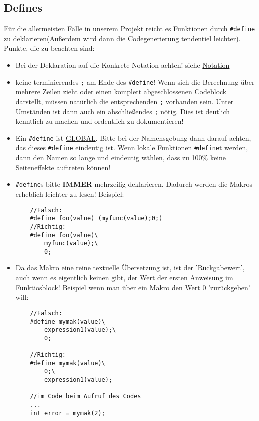 \documentclass[]{scrartcl}
\begin{document}
\subsection{Defines}
\label{sbsec:Defines}
Für die allermeisten Fälle in unserem Projekt reicht es Funktionen durch \lstinline|#define| zu deklarieren(Außerdem wird dann die Codegenerierung tendentiel leichter). Punkte, die zu beachten sind:
\begin{itemize}
\item Bei der Deklaration auf die Konkrete Notation achten! siehe \href{http://www2.informatik.uni-halle.de/lehre/c/c_define.html}{Notation}
\item keine terminierendes \lstinline|;| am Ende des \lstinline|#define|! Wenn sich die Berechnung über mehrere Zeilen zieht oder einen komplett abgeschlossenen Codeblock darstellt, müssen natürlich die entsprechenden \lstinline|;| vorhanden sein. Unter Umständen ist dann auch ein abschließendes \lstinline|;| nötig. Dies ist deutlich kenntlich zu machen und ordentlich zu dokumentieren!
\item Ein \lstinline|#define| ist \underline{GLOBAL}. Bitte bei der Namensgebung dann darauf achten, das dieses \lstinline|#define| eindeutig ist. Wenn lokale Funktionen \lstinline|#define|t werden, dann den Namen so lange und eindeutig wählen, dass zu 100\% keine Seiteneffekte auftreten können!
\item \lstinline|#define|s bitte \textbf{IMMER} mehrzeilig deklarieren. Dadurch werden die Makros erheblich leichter zu lesen!
	Beispiel:
	\begin{lstlisting}
	//Falsch:
	#define foo(value) (myfunc(value);0;)
	//Richtig:
	#define foo(value)\
		myfunc(value);\
		0;
	\end{lstlisting}
\item Da das Makro eine reine textuelle Übersetzung ist, ist der 'Rückgabewert', auch wenn es eigentlich keinen gibt, der Wert der ersten Anweisung im Funktiosblock! Beispiel wenn man über ein Makro den Wert 0 'zurückgeben' will:
	\begin{lstlisting}
	//Falsch:
	#define mymak(value)\
		expression1(value);\
		0;
		
	//Richtig:
	#define mymak(value)\
		0;\
		expression1(value);
		
	//im Code beim Aufruf des Codes
	...
	int error = mymak(2);
	\end{lstlisting}
\end{itemize}
\end{document}
